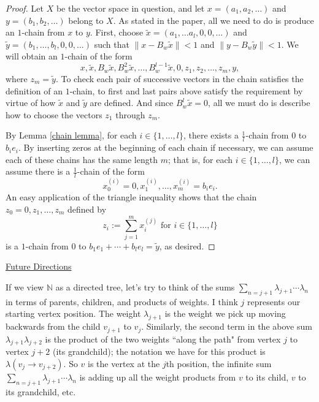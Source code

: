 \documentclass{article}
\newcommand{\ds}{\displaystyle}
\theoremstyle{definition}\newtheorem{remark}[theorem]{Remark}
\theoremstyle{definition}\newtheorem{example}[theorem]{Example}
\theoremstyle{definition}\newtheorem{fact}[theorem]{Fact}
\theoremstyle{definition}\newtheorem{diagram}[theorem]{Diagram}
\theoremstyle{definition}\newtheorem{definition}[theorem]{Definition}
\theoremstyle{definition}\newtheorem{question}[theorem]{Question}
\newcommand{\N}{\mathbb{N}}
\begin{document}
\begin{proof}
    Let $X$ be the vector space in question, and let $x=(a_1,a_2,\ldots)$ and $y=(b_1,b_2,\ldots)$ belong to $X$. As stated in the paper, all we need to do is produce an $1$-chain from $x$ to $y$. First, choose $\widetilde{x}=(a_1,\ldots a_l,0,0,\ldots)$ and $\widetilde{y}=(b_1,\ldots,b_l,0,0,\ldots)$ such that $\|x-B_w\widetilde{x}\|<1$ and $\|y-B_w \widetilde{y}\|<1$. We will obtain an $1$-chain of the form
    \[x,\widetilde{x},B_w \widetilde{x},B_w^2 \widetilde{x},\ldots,B_w^{l-1}\widetilde{x},0,z_1,z_2,\ldots,z_m,y,\]
    where $z_m=\widetilde{y}$. To check each pair of successive vectors in the chain satisfies the definition of an $1$-chain, to first and last pairs above satisfy the requirement by virtue of how $\widetilde{x}$ and $\widetilde{y}$ are defined. And since $B_w^l \widetilde{x}=0$, all we must do is describe how to choose the vectors $z_1$ through $z_m$. 

    By Lemma \ref{chain lemma}, for each $i\in \{1,\ldots,l\}$, there exists a $\frac{1}{l}$-chain from $0$ to $b_i e_i$. By inserting zeros at the beginning of each chain if necessary, we can assume each of these chains has the same length $m$; that is, for each $i\in \{1,\ldots,l\}$, we can assume there is a $\frac{1}{l}$-chain of the form
    \[x_0^{(i)}=0,x_1^{(i)},\ldots,x_m^{(i)}=b_ie_i.\]
    An easy application of the triangle inequality shows that the chain 
    $z_0=0,z_1,\ldots,z_m$ defined by
    \[z_i:=\sum_{j=1}^m x_i^{(j)} \text{ for } i\in\{1,\ldots,l\}\]
    is a $1$-chain from $0$ to $b_1e_1+\cdots +b_l e_l=\widetilde{y}$, as desired.
\end{proof}

\underline{{\Large Future Directions}}

If we view $\N$ as a directed tree, let's try to think of the sums $\ds\sum_{n=j+1} \lambda_{j+1}\cdots \lambda_n$ in terms of parents, children, and products of weights. I think $j$ represents our starting vertex position. The weight $\lambda_{j+1}$ is the weight we pick up moving backwards from the child $v_{j+1}$ to $v_j$. Similarly, the second term in the above sum $\lambda_{j+1}\lambda_{j+2}$ is the product of the two weights ``along the path" from vertex $j$ to vertex $j+2$ (its grandchild); the notation we have for this product is $\lambda(v_j\to v_{j+2})$. So $v$ is the vertex at the $j$th position, the infinite sum $\ds\sum_{n=j+1} \lambda_{j+1}\cdots \lambda_n$ is adding up all the weight products from $v$ to its child, $v$ to its grandchild, etc.
\end{document}
